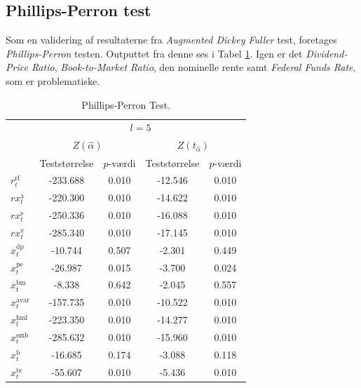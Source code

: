 \documentclass[
  a4paper,
  oneside]{memoir}
\begin{document}
\hypertarget{philper}{%
\subsection{Phillips-Perron test}\label{philper}}

Som en validering af resultaterne fra \emph{Augmented Dickey Fuller} test, foretages \emph{Phillips-Perron} testen. Outputtet fra denne ses i Tabel \ref{tab:STAT-PP}. Igen er det \emph{Dividend-Price Ratio}, \emph{Book-to-Market Ratio}, den nominelle rente samt \emph{Federal Funds Rate}, som er problematiske.

\begin{table}[H]

\caption{\label{tab:STAT-PP}Phillips-Perron Test.}
\centering
\begin{threeparttable}
\begin{tabular}[t]{lcccc}
\toprule
\multicolumn{1}{c}{ } & \multicolumn{4}{c}{$l=5$} \\
\cmidrule(l{3pt}r{3pt}){2-5}
\multicolumn{1}{c}{ } & \multicolumn{2}{c}{$Z(\hat{\alpha})$} & \multicolumn{2}{c}{$Z(t_{\hat{\alpha}})$} \\
\cmidrule(l{3pt}r{3pt}){2-3} \cmidrule(l{3pt}r{3pt}){4-5}
  & Teststørrelse & $p$-værdi & Teststørrelse & $p$-værdi\\
\midrule
\rowcolor{gray!6}  $r_t^{\text{rf}}$ & -233.688 & 0.010 & -12.546 & 0.010\\
$rx_t^{\text{a}}$ & -220.300 & 0.010 & -14.622 & 0.010\\
\rowcolor{gray!6}  $rx_t^{\text{s}}$ & -250.336 & 0.010 & -16.088 & 0.010\\
$rx_t^{\text{v}}$ & -285.340 & 0.010 & -17.145 & 0.010\\
\rowcolor{gray!6}  $x_t^{\text{dp}}$ & -10.744 & 0.507 & -2.301 & 0.449\\
$x_t^{\text{pe}}$ & -26.987 & 0.015 & -3.700 & 0.024\\
\rowcolor{gray!6}  $x_t^{\text{bm}}$ & -8.338 & 0.642 & -2.045 & 0.557\\
$x_t^{\text{avar}}$ & -157.735 & 0.010 & -10.522 & 0.010\\
\rowcolor{gray!6}  $x_t^{\text{hml}}$ & -223.350 & 0.010 & -14.277 & 0.010\\
$x_t^{\text{smb}}$ & -285.632 & 0.010 & -15.960 & 0.010\\
\rowcolor{gray!6}  $x_t^{\text{b}}$ & -16.685 & 0.174 & -3.088 & 0.118\\
$x_t^{\text{ts}}$ & -55.607 & 0.010 & -5.436 & 0.010\\

\end{tabular}
\end{threeparttable}
\end{table}
\end{document}
